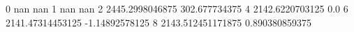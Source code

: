 0 nan nan
1 nan nan
2 2445.2998046875 302.677734375
4 2142.6220703125 0.0
6 2141.47314453125 -1.14892578125
8 2143.512451171875 0.890380859375
